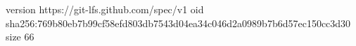 version https://git-lfs.github.com/spec/v1
oid sha256:769b80eb7b99cf58efd803db7543d04ea34c046d2a0989b7b6d57ec150cc3d30
size 66
